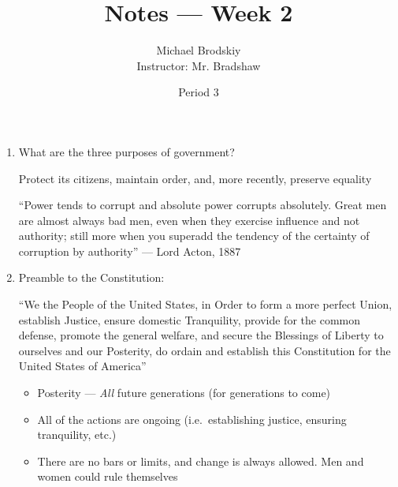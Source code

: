 \documentclass[12pt]{article}
\title{Notes — Week 2}
\date{Period 3}
\author{Michael Brodskiy\\ \small Instructor: Mr. Bradshaw}
\begin{document}
\maketitle

\begin{enumerate}

  \item What are the three purposes of government?

    \begin{justify}

      Protect its citizens, maintain order, and, more recently, preserve equality

    \end{justify}

    \begin{justify}

      “Power tends to corrupt and absolute power corrupts absolutely. Great men are almost always bad men, even when they exercise influence and not authority; still more when you superadd the tendency of the certainty of corruption by authority” — Lord Acton, 1887

    \end{justify}

  \item Preamble to the Constitution:

    \begin{justify}

      “We the People of the United States, in Order to form a more perfect Union, establish Justice, ensure domestic Tranquility, provide for the common defense, promote the general welfare, and secure the Blessings of Liberty to ourselves and our Posterity, do ordain and establish this Constitution for the United States of America”

    \end{justify}

    \begin{itemize}

      \item Posterity — \textit{All} future generations (for generations to come)

      \item All of the actions are ongoing (i.e.\ establishing justice, ensuring tranquility, etc.)

      \item There are no bars or limits, and change is always allowed. Men and women could rule themselves


\end{itemize}
\end{enumerate}
\end{document}
